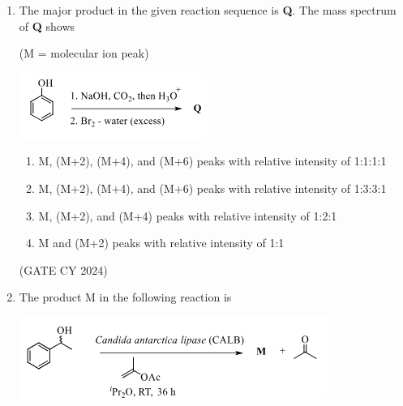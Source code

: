 \documentclass[12pt]{article}
\begin{document}
\begin{enumerate}
\begin{multicols}{2}
\begin{enumerate}
\item \textbf{P}
\item \textbf{Q}
\item \textbf{R}
\item \textbf{S}
\end{enumerate}
\end{multicols}
\hfill (GATE CY 2024)


\item The major product in the given reaction sequence is \textbf{Q}. The mass spectrum of \textbf{Q} shows

(M = molecular ion peak)

\begin{center}
\includegraphics[width=0.35\columnwidth]{figs/q16.png}
\end{center}

\begin{enumerate} 
\item M, (M+2), (M+4), and (M+6) peaks with relative intensity of 1:1:1:1
\item M, (M+2), (M+4), and (M+6) peaks with relative intensity of 1:3:3:1
\item M, (M+2), and (M+4) peaks with relative intensity of 1:2:1
\item M and (M+2) peaks with relative intensity of 1:1
\end{enumerate}
\hfill (GATE CY 2024)

\item The product M in the following reaction is

\begin{center}
\includegraphics[width=0.45\columnwidth]{figs/q17.png}
\end{center}


\end{enumerate}
\end{document}

